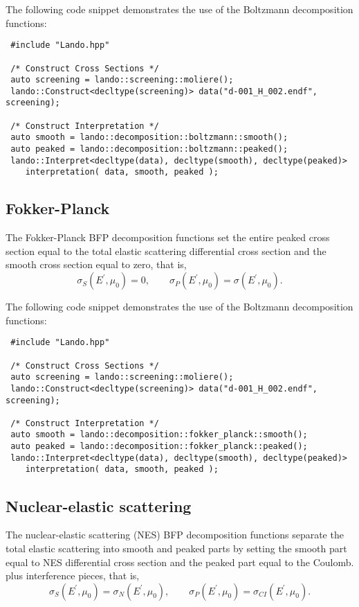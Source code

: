 \documentclass[../main.tex]{subfiles}
\begin{document}
The following code snippet demonstrates the use of the Boltzmann decomposition functions:
\begin{verbatim}
 #include "Lando.hpp"

 /* Construct Cross Sections */
 auto screening = lando::screening::moliere();
 lando::Construct<decltype(screening)> data("d-001_H_002.endf", screening);
 
 /* Construct Interpretation */
 auto smooth = lando::decomposition::boltzmann::smooth();
 auto peaked = lando::decomposition::boltzmann::peaked();
 lando::Interpret<decltype(data), decltype(smooth), decltype(peaked)> 
    interpretation( data, smooth, peaked );
\end{verbatim}

\subsection{Fokker-Planck}
The Fokker-Planck BFP decomposition functions set the entire peaked cross section equal to the total elastic scattering differential cross section and the smooth cross section equal to zero, that is,
\begin{equation}
    \sigma_S(E^{\prime},\mu_0) = 0, \quad \quad \sigma_P(E^{\prime},\mu_0) = \sigma(E^{\prime},\mu_0).
\end{equation}

The following code snippet demonstrates the use of the Boltzmann decomposition functions:
\begin{verbatim}
 #include "Lando.hpp"

 /* Construct Cross Sections */
 auto screening = lando::screening::moliere();
 lando::Construct<decltype(screening)> data("d-001_H_002.endf", screening);
 
 /* Construct Interpretation */
 auto smooth = lando::decomposition::fokker_planck::smooth();
 auto peaked = lando::decomposition::fokker_planck::peaked();
 lando::Interpret<decltype(data), decltype(smooth), decltype(peaked)> 
    interpretation( data, smooth, peaked );
\end{verbatim}

\subsection{Nuclear-elastic scattering}
The nuclear-elastic scattering (NES) BFP decomposition functions separate the total elastic scattering into smooth and peaked parts by setting the smooth part equal to NES differential cross section and the peaked part equal to the Coulomb. plus interference pieces, that is,
\begin{equation}
    \sigma_S(E^{\prime},\mu_0) = \sigma_{N}(E^{\prime},\mu_0), \quad \quad \sigma_P(E^{\prime},\mu_0) = \sigma_{CI}(E^{\prime},\mu_0).
\end{equation}
\end{document}
